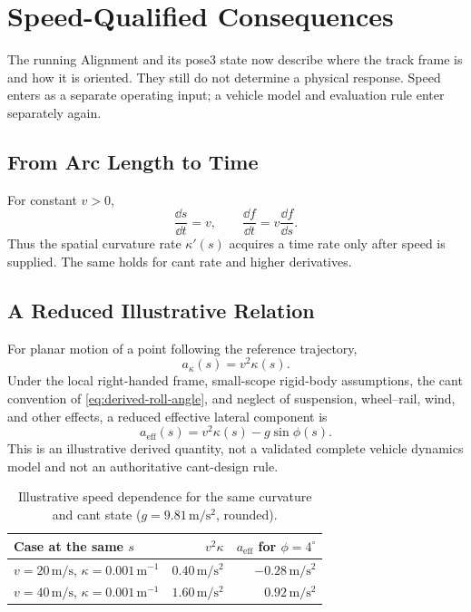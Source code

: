 \chapter{Speed-Qualified Consequences}

The running Alignment and its pose3 state now describe where the track frame
is and how it is oriented. They still do not determine a physical response.
Speed enters as a separate operating input; a vehicle model and evaluation
rule enter separately again.

\section{From Arc Length to Time}

For constant \(v>0\),
\[
\frac{\dd s}{\dd t}=v,
\qquad
\frac{\dd f}{\dd t}=v\frac{\dd f}{\dd s}.
\]
Thus the spatial curvature rate \(\kappa'(s)\) acquires a time rate only after
speed is supplied. The same holds for cant rate and higher derivatives.

\section{A Reduced Illustrative Relation}

For planar motion of a point following the reference trajectory,
\[
a_\kappa(s)=v^2\kappa(s).
\]
Under the local right-handed frame, small-scope rigid-body assumptions, the
cant convention of \cref{eq:derived-roll-angle}, and neglect of suspension,
wheel--rail, wind, and other effects, a reduced effective lateral component is
\[
a_{\mathrm{eff}}(s)=v^2\kappa(s)-g\sin\phi(s).
\]
This is an illustrative derived quantity, not a validated complete vehicle
dynamics model and not an authoritative cant-design rule.

\begin{table}[htbp]
\centering
\small
\begin{tabular}{lrr}
\toprule
Case at the same \(s\) & \(v^2\kappa\) & \(a_{\mathrm{eff}}\) for \(\phi=4^\circ\)\\
\midrule
\(v=20\,\mathrm{m/s}\), \(\kappa=0.001\,\mathrm{m^{-1}}\) & \(0.40\,\mathrm{m/s^2}\) & \(-0.28\,\mathrm{m/s^2}\)\\
\(v=40\,\mathrm{m/s}\), \(\kappa=0.001\,\mathrm{m^{-1}}\) & \(1.60\,\mathrm{m/s^2}\) & \(0.92\,\mathrm{m/s^2}\)\\
\bottomrule
\end{tabular}
\caption{Illustrative speed dependence for the same curvature and cant state (\(g=9.81\,\mathrm{m/s^2}\), rounded).}
\label{tab:same-curvature-two-speeds}
\end{table}

